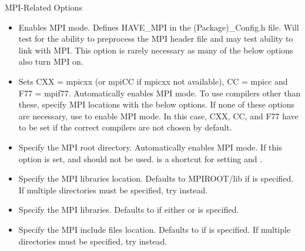 MPI-Related Options

\begin{itemize}
\item {}

Enables MPI mode. Defines HAVE\_MPI in the (Package)\_Config.h file. Will test 
for the ability to preprocess the MPI header file and may test ability to link 
with MPI.  This option is rarely necessary as many of the below options also 
turn MPI on.  

\item {}

Sets CXX = mpicxx (or mpiCC if mpicxx not available), CC = mpicc and 
F77 = mpif77.  Automatically enables MPI mode.  To use compilers other than 
these, specify MPI locations with the below options.  If none of these options 
are necessary, use  to enable MPI mode.  In this 
case, CXX, CC, and F77 have to be set if the correct compilers are 
not chosen by default.

\item {}

Specify the MPI root directory. Automatically enables MPI mode.  If this 
option is set,  and 
 should not be used.  
 is a shortcut for setting \newline
{} 
and \newline {}.

\item {}

Specify the MPI libraries location. Defaults to MPIROOT/lib if 
 is specified. If multiple directories must be 
specified, try \newline
{} instead. 

\item {} 

Specify the MPI libraries. Defaults to 
 if either or 
 is specified.

\item {}

Specify the MPI include files location. Defaults to  if 
 is specified. If multiple directories  must be specified, try 
\newline
{} instead.
\end{itemize}

